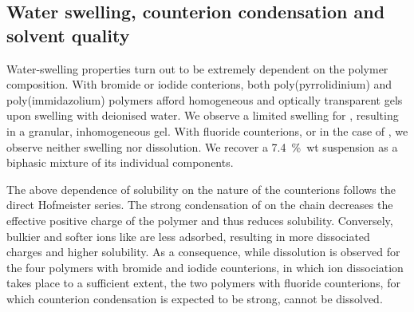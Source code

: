 \documentclass[twoside,twocolumn,9pt]{article}
\begin{document}
\subsection{Water swelling, counterion condensation and solvent quality}
Water-swelling properties turn out to be extremely dependent on the polymer composition. With bromide or iodide conterions, both poly(pyrrolidinium) and poly(immidazolium) polymers afford homogeneous and optically transparent gels upon swelling with deionised water. We observe a limited swelling for , resulting in a granular, inhomogeneous gel. With fluoride counterions, or in the case of , we observe neither swelling nor dissolution. We recover a 7.4~\%~wt suspension as a biphasic mixture of its individual components.

The above dependence of solubility on the nature of the counterions follows the direct Hofmeister series. The strong condensation of  on the chain decreases the effective positive charge of the polymer and thus reduces solubility. Conversely, bulkier and softer ions like  are less adsorbed, resulting in more dissociated charges and higher solubility. As a consequence, while dissolution is observed for the four polymers with bromide and iodide counterions, in which ion dissociation takes place to a sufficient extent, the two polymers with fluoride counterions, for which counterion condensation is expected to be strong, cannot be dissolved.
\end{document}
